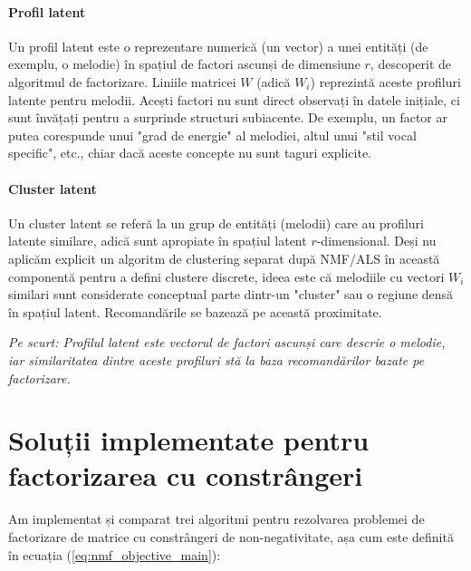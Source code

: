 \documentclass[12pt,a4paper]{article}
\begin{document}
	\paragraph{Profil latent}
	Un profil latent este o reprezentare numerică (un vector) a unei entități (de exemplu, o melodie) în spațiul de factori ascunși de dimensiune $r$, descoperit de algoritmul de factorizare. Liniile matricei $W$ (adică $W_i$) reprezintă aceste profiluri latente pentru melodii. Acești factori nu sunt direct observați în datele inițiale, ci sunt învățați pentru a surprinde structuri subiacente. De exemplu, un factor ar putea corespunde unui "grad de energie" al melodiei, altul unui "stil vocal specific", etc., chiar dacă aceste concepte nu sunt taguri explicite.
	
	\paragraph{Cluster latent}
	Un cluster latent se referă la un grup de entități (melodii) care au profiluri latente similare, adică sunt apropiate în spațiul latent $r$-dimensional. Deși nu aplicăm explicit un algoritm de clustering separat după NMF/ALS în această componentă pentru a defini clustere discrete, ideea este că melodiile cu vectori $W_i$ similari sunt considerate conceptual parte dintr-un "cluster" sau o regiune densă în spațiul latent. Recomandările se bazează pe această proximitate.
	
	\vspace{0.5em}
	\textit{Pe scurt: Profilul latent este vectorul de factori ascunși care descrie o melodie, iar similaritatea dintre aceste profiluri stă la baza recomandărilor bazate pe factorizare.}
	\vspace{1em} 
	
	\section{Soluții implementate pentru factorizarea cu constrângeri}
	
	Am implementat și comparat trei algoritmi pentru rezolvarea problemei de factorizare de matrice cu constrângeri de non-negativitate, așa cum este definită în ecuația (\ref{eq:nmf_objective_main}):
	
\end{document}
